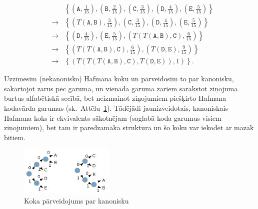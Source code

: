 \documentclass[11pt]{article}
\begin{document}
\begin{eqnarray}
 & & \left\{ \left( \mathtt{A}, \frac{1}{15} \right), \left( \mathtt{B}, \frac{2}{15} \right), \left( \mathtt{C}, \frac{3}{15} \right),
\left( \mathtt{D}, \frac{4}{15} \right), \left( \mathtt{E}, \frac{5}{15} \right) \right\} \\
 & \rightarrow & \left\{ \left( T(\mathtt{A},\mathtt{B}), \frac{3}{15} \right), \left( \mathtt{C}, \frac{3}{15} \right),
\left( \mathtt{D}, \frac{4}{15} \right), \left( \mathtt{E}, \frac{5}{15} \right) \right\} \\
 & \rightarrow & \left\{ \left( \mathtt{D}, \frac{4}{15} \right), \left( \mathtt{E}, \frac{5}{15} \right),
\left( T(T(\mathtt{A},\mathtt{B}), \mathtt{C}), \frac{6}{15} \right) \right\} \\
 & \rightarrow & \left\{ \left( T(T(\mathtt{A},\mathtt{B}), \mathtt{C}), \frac{6}{15} \right), \left( T(\mathtt{D},\mathtt{E}), \frac{9}{15} \right) \right\} \\
 & \rightarrow & \left\{ \left( T( T(T(\mathtt{A},\mathtt{B}), \mathtt{C}), T(\mathtt{D},\mathtt{E})), 1 \right) \right\}.
\end{eqnarray}

Uzzīmēsim (nekanonisko) Hafmana koku un pārveidosim to par kanonisku, sakārtojot zarus pēc garuma, un vienāda garuma zariem sarakstot
ziņojuma burtus alfabētiskā secībā, bet neizmainot ziņojumiem piešķirto Hafmana kodavārda garumus (sk.\ Attēlu~\ref{fig:huffman-canonical}). 
Tādējādi jaunizveidotais, kanoniskais Hafmana koks
ir ekvivalents sākotnējam (saglabā koda garumus visiem ziņojumiem), bet tam ir paredzamāka
struktūra un šo koku var iekodēt ar mazāk bitiem.

\begin{figure}[h!]
\begin{center}
\includegraphics[width=0.4\textwidth]{huffman-canonical.png}
\caption{Koka pārveidojums par kanonisku\label{fig:huffman-canonical}}
\end{center}
\end{figure}
\end{document}
